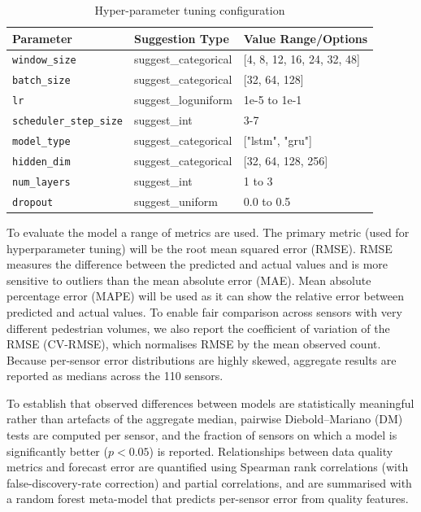 \documentclass[journal,sensors,submit,pdftex,moreauthors]{Definitions/mdpi}
\begin{document}
\begin{table}[htbp]
\caption{Hyper-parameter tuning configuration}\label{tab:hyperparameters}
\begin{tabular}{@{}lll@{}}
\toprule
\textbf{Parameter} & \textbf{Suggestion Type} & \textbf{Value Range/Options} \\
\midrule
\texttt{window\_size} & suggest\_categorical & [4, 8, 12, 16, 24, 32, 48] \\
\texttt{batch\_size} & suggest\_categorical & [32, 64, 128] \\
\texttt{lr} & suggest\_loguniform & 1e-5 to 1e-1 \\
\texttt{scheduler\_step\_size} & suggest\_int & 3-7 \\
\texttt{model\_type} & suggest\_categorical & ["lstm", "gru"] \\
\texttt{hidden\_dim} & suggest\_categorical & [32, 64, 128, 256] \\
\texttt{num\_layers} & suggest\_int & 1 to 3 \\
\texttt{dropout} & suggest\_uniform & 0.0 to 0.5 \\
\bottomrule
\end{tabular}
\end{table}

To evaluate the model a range of metrics are used. The primary metric (used for hyperparameter tuning) will be the root mean squared error (RMSE). RMSE measures the difference between the predicted and actual values and is more sensitive to outliers than the mean absolute error (MAE). Mean absolute percentage error (MAPE) will be used as it can show the relative error between predicted and actual values. To enable fair comparison across sensors with very different pedestrian volumes, we also report the coefficient of variation of the RMSE (CV-RMSE), which normalises RMSE by the mean observed count. Because per-sensor error distributions are highly skewed, aggregate results are reported as medians across the 110 sensors.

To establish that observed differences between models are statistically meaningful rather than artefacts of the aggregate median, pairwise Diebold--Mariano (DM) tests \citep{dieboldComparingPredictiveAccuracy1995} are computed per sensor, and the fraction of sensors on which a model is significantly better ($p<0.05$) is reported. Relationships between data quality metrics and forecast error are quantified using Spearman rank correlations (with false-discovery-rate correction) and partial correlations, and are summarised with a random forest meta-model that predicts per-sensor error from quality features.
\end{document}
